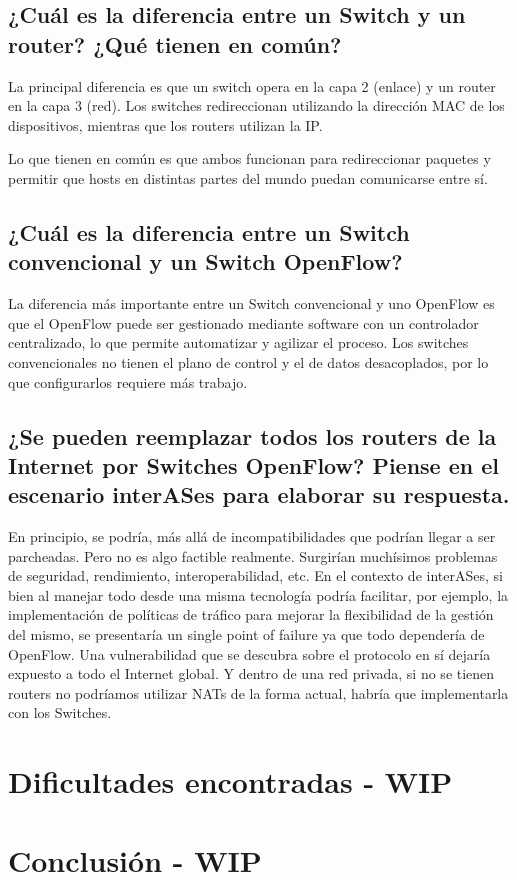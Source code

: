 \documentclass{article}
\begin{document}
\subsection{¿Cuál es la diferencia entre un Switch y un router? ¿Qué tienen en común?}

La principal diferencia es que un switch opera en la capa 2 (enlace) y un router en la capa 3 (red). Los switches redireccionan utilizando la dirección MAC de los dispositivos, mientras que los routers utilizan la IP.

Lo que tienen en común es que ambos funcionan para redireccionar paquetes y permitir que hosts en distintas partes del mundo puedan comunicarse entre sí.

\subsection{¿Cuál es la diferencia entre un Switch convencional y un Switch OpenFlow?}

La diferencia más importante entre un Switch convencional y uno OpenFlow es que el OpenFlow puede ser gestionado mediante software con un controlador centralizado, lo que permite automatizar y agilizar el proceso. Los switches convencionales no tienen el plano de control y el de datos desacoplados, por lo que configurarlos requiere más trabajo.

\subsection{¿Se pueden reemplazar todos los routers de la Internet por Switches OpenFlow? Piense en el escenario interASes para elaborar su respuesta.}

En principio, se podría, más allá de incompatibilidades que podrían llegar a ser parcheadas. Pero no es algo factible realmente. Surgirían muchísimos problemas de seguridad, rendimiento, interoperabilidad, etc. En el contexto de interASes, si bien al manejar todo desde una misma tecnología podría facilitar, por ejemplo, la implementación de políticas de tráfico para mejorar la flexibilidad de la gestión del mismo, se presentaría un single point of failure ya que todo dependería de OpenFlow. Una vulnerabilidad que se descubra sobre el protocolo en sí dejaría expuesto a todo el Internet global. Y dentro de una red privada, si no se tienen routers no podríamos utilizar NATs de la forma actual, habría que implementarla con los Switches. 

\section{Dificultades encontradas - WIP}\label{dificultades-encontradas}

\section{Conclusión - WIP}\label{conclusion-wip}
\end{document}
